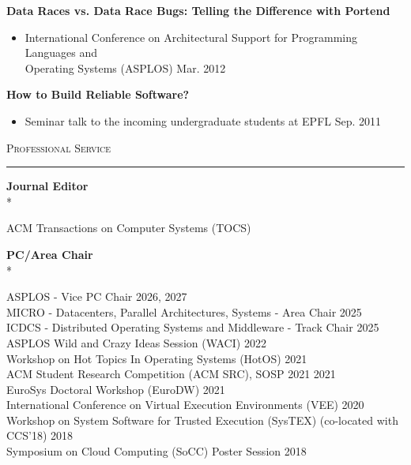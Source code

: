 \documentclass[10pt]{article}
\newcommand{\mysec}[1]{%
  \par\addvspace{2em}%
  \Needspace{8\baselineskip}%
  \noindent\textsc{\large #1}\par\vspace{1mm}\hrule\vspace{2mm}%
}
\newcommand{\mysub}[3]{\textbf{#1} {#2} \hfill {\em #3}}
\newcommand{\myssub}[1]{%
  \par\begingroup
    \leftskip=2mm\relax
    \noindent #1\par
  \endgroup
  \vspace{1mm}%
}
\begin{document}
\mysub{Data Races vs. Data Race Bugs: Telling the Difference with Portend}{}{} 
\vspace{-2mm}
\begin{itemize}
\setlength\itemsep{0em}
\item{International Conference on Architectural Support for Programming Languages and \\ Operating Systems (ASPLOS)} \hfill Mar. 2012
\end{itemize}

\mysub{How to Build Reliable Software?}{}{} 
\vspace{-2mm}
\begin{itemize}
\setlength\itemsep{0em}
\item{Seminar talk to the incoming undergraduate students at EPFL} \hfill  Sep. 2011
\end{itemize}


\mysec{Professional Service}

\mysub{Journal Editor}{}{}\\*
\myssub{\vspace{2mm}
  ACM Transactions on Computer Systems (TOCS) \\
}


\mysub{PC/Area Chair}{}{}\\*
\myssub{\vspace{2mm}
  ASPLOS - Vice PC Chair \hfill 2026, 2027 \\
  MICRO - Datacenters, Parallel Architectures, Systems - Area Chair \hfill 2025 \\ 
  ICDCS - Distributed Operating Systems and Middleware - Track Chair \hfill 2025 \\ 
  ASPLOS Wild and Crazy Ideas Session (WACI) \hfill 2022 \\ 
  Workshop on Hot Topics In Operating Systems (HotOS) \hfill 2021 \\
  ACM Student Research Competition (ACM SRC), SOSP 2021 \hfill 2021 \\
  EuroSys Doctoral Workshop (EuroDW) \hfill 2021 \\
  International Conference on Virtual Execution Environments (VEE) \hfill 2020 \\
  Workshop on System Software for Trusted Execution (SysTEX) (co-located with CCS'18) \hfill 2018 \\
  Symposium on Cloud Computing (SoCC) Poster Session \hfill 2018 \\
}
\end{document}
